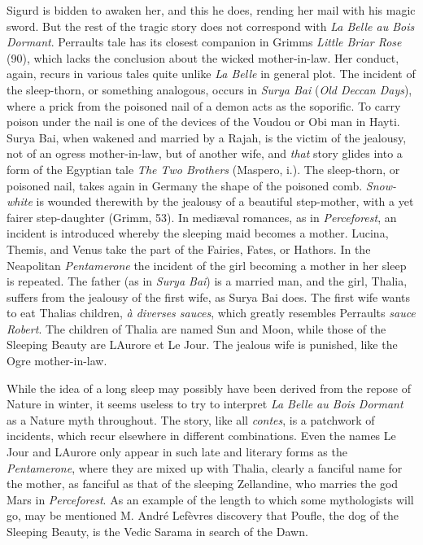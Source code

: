 \documentclass[14pt,a4paper]{memoir}
\begin{document}
{Sigurd is bidden to awaken her, and this he does, rending her mail with
his magic sword. But the rest of the tragic story does not correspond
with \emph{La Belle au Bois Dormant}. Perrault\textquotesingle s tale
has its closest companion in Grimm\textquotesingle s \emph{Little Briar
Rose} (90), which lacks the conclusion about the wicked mother-in-law.
Her conduct, again, recurs in various tales quite unlike \emph{La Belle}
in general plot. The incident of the sleep-thorn, or something
analogous, occurs in \emph{Surya Bai} (\emph{Old Deccan Days}), where a
prick from the poisoned nail of a demon acts as the soporific. To carry
poison under the nail is one of the devices of the Voudou or Obi man in
Hayti. Surya Bai, when wakened and married by a Rajah, is the victim of
the jealousy, not of an ogress mother-in-law, but of another wife, and
\emph{that} story glides into a form of the Egyptian tale \emph{The Two
Brothers} (Maspero, i.). The sleep-thorn, or poisoned nail, takes again
in Germany the shape of the poisoned comb. \emph{Snow-white} is wounded
therewith by the jealousy of a beautiful step-mother, with a yet fairer
step-daughter (Grimm, 53). In mediæval romances, as in
\emph{Perceforest}, an incident is introduced whereby the sleeping maid
becomes a mother. Lucina, Themis, and Venus take the part of the
Fairies, Fates, or Hathors. In the Neapolitan \emph{Pentamerone} the
incident of the girl becoming a mother in her sleep is repeated. The
father (as in \emph{Surya Bai}) is a married man, and the girl, Thalia,
suffers from the jealousy of the first wife, as Surya Bai does. The
first wife wants to eat Thalia\textquotesingle s children, \emph{à
diverses sauces}, which greatly resembles Perrault\textquotesingle s
\emph{sauce Robert}. The children of Thalia are named Sun and Moon,
while those of the Sleeping Beauty are L\textquotesingle Aurore et Le
Jour. The jealous wife is punished, like the Ogre
mother-in-law.

While the idea of a long sleep may possibly have been derived from the
repose of Nature in winter, it seems useless to try to interpret
\emph{La Belle au Bois Dormant} as a Nature myth throughout. The story,
like all \emph{contes}, is a patchwork of incidents, which recur
elsewhere in different combinations. Even the names Le Jour and
L\textquotesingle Aurore only appear in such late and literary forms as
the \emph{Pentamerone}, where they are mixed up with Thalia, clearly a
fanciful name for the mother, as fanciful as that of the sleeping
Zellandine, who marries the god Mars in \emph{Perceforest}. As an
example of the length to which some mythologists will go, may be
mentioned M. André Lefèvre\textquotesingle s discovery that Poufle, the
dog of the Sleeping Beauty, is the Vedic Sarama in search of the Dawn.

}
\end{document}
